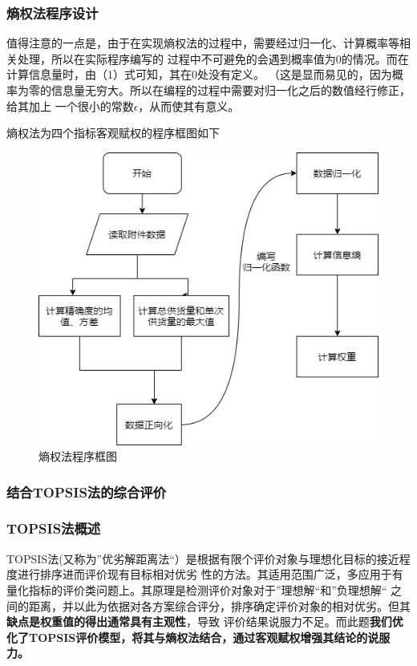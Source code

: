 \documentclass{cumcmthesis}
\begin{document}
\subsubsection*{熵权法程序设计}
值得注意的一点是，由于在实现熵权法的过程中，需要经过归一化、计算概率等相关处理，所以在实际程序编写的
过程中不可避免的会遇到概率值为0的情况。而在计算信息量时，由（1）式可知，其在0处没有定义。
（这是显而易见的，因为概率为零的信息量无穷大。所以在编程的过程中需要对归一化之后的数值经行修正，给其加上
一个很小的常数$\epsilon$\cite{黄鹏2015福建省土地生态安全AHP法和熵值法动态评价比较}，从而使其有意义。\par
熵权法为四个指标客观赋权的程序框图如下
\begin{figure}[H]
    \centering
    \includegraphics[scale=0.6]{shangquan.png}
    \caption{熵权法程序框图}     \label{fig:2}
\end{figure}
\subsubsection{结合TOPSIS法的综合评价}
\subsubsection*{TOPSIS法概述}
TOPSIS法(又称为”优劣解距离法“）是根据有限个评价对象与理想化目标的接近程度进行排序进而评价现有目标相对优劣
性的方法。其适用范围广泛，多应用于有量化指标的评价类问题上。其原理是检测评价对象对于”理想解“和”负理想解“
之间的距离，并以此为依据对各方案综合评分，排序确定评价对象的相对优劣。但其\textbf{缺点是权重值的得出通常具有主观性}，导致
评价结果说服力不足。而此题\textbf{我们优化了TOPSIS评价模型，将其与熵权法结合，通过客观赋权增强其结论的说服力。}
\end{document}
